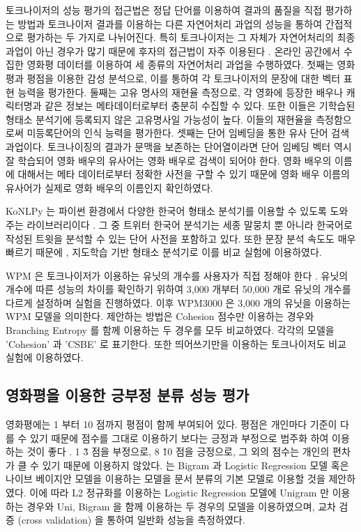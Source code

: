 \documentclass[oneside, ko,phd]{snuthesis_utf8_kor}
\begin{document}
토크나이저의 성능 평가의 접근법은 정답 단어를 이용하여 결과의 품질을 직접 평가하는 방법과 토크나이저 결과를 이용하는 다른 자연어처리 과업의 성능을 통하여 간접적으로 평가하는 두 가지로 나뉘어진다.
특히 토크나이저는 그 자체가 자연어처리의 최종 과업이 아닌 경우가 많기 때문에 후자의 접근법이 자주 이용된다 \cite{chung2009unsupervised}.
온라인 공간에서 수집한 영화평 데이터를 이용하여 세 종류의 자연어처리 과업을 수행하였다.
첫째는 영화평과 평점을 이용한 감성 분석으로, 이를 통하여 각 토크나이저의 문장에 대한 벡터 표현 능력을 평가한다.
둘째는 고유 명사의 재현율 측정으로, 각 영화에 등장한 배우나 캐릭터명과 같은 정보는 메타데이터로부터 충분히 수집할 수 있다.
또한 이들은 기학습된 형태소 분석기에 등록되지 않은 고유명사일 가능성이 높다.
이들의 재현율을 측정함으로써 미등록단어의 인식 능력을 평가한다.
셋째는 단어 임베딩을 통한 유사 단어 검색 과업이다.
토크나이징의 결과가 문맥을 보존하는 단어열이라면 단어 임베딩 벡터 역시 잘 학습되어 영화 배우의 유사어는 영화 배우로 검색이 되어야 한다.
영화 배우의 이름에 대해서는 메타 데이터로부터 정확한 사전을 구할 수 있기 때문에 영화 배우 이름의 유사어가 실제로 영화 배우의 이름인지 확인하였다.

KoNLPy 는 파이썬 환경에서 다양한 한국어 형태소 분석기를 이용할 수 있도록 도와주는 라이브러리이다 \cite{konlpy}.
그 중 트위터 한국어 분석기는 세종 말뭉치 뿐 아니라 한국어로 작성된 트윗을 분석할 수 있는 단어 사전을 포함하고 있다.
또한 문장 분석 속도도 매우 빠르기 때문에 \cite{konlpy}, 지도학습 기반 형태소 분석기로 이를 비교 실험에 이용하였다.

WPM 은 토크나이저가 이용하는 유닛의 개수를 사용자가 직접 정해야 한다 \cite{wu2016google}.
유닛의 개수에 따른 성능의 차이를 확인하기 위하여 3,000 개부터 50,000 개로 유닛의 개수를 다르게 설정하며 실험을 진행하였다.
이후 WPM3000 은 3,000 개의 유닛을 이용하는 WPM 모델을 의미한다.
제안하는 방법은 Cohesion 점수만 이용하는 경우와 Branching Entropy 를 함께 이용하는 두 경우를 모두 비교하였다.
각각의 모델을 'Cohesion' 과 'CSBE' 로 표기한다.
또한 띄어쓰기만을 이용하는 토크나이저도 비교 실험에 이용하였다.

\subsection{영화평을 이용한 긍부정 분류 성능 평가}
영화평에는 1 부터 10 점까지 평점이 함께 부여되어 있다.
평점은 개인마다 기준이 다를 수 있기 때문에 점수를 그대로 이용하기 보다는 긍정과 부정으로 범주화 하여 이용하는 것이 좋다 \cite{pang2008opinion, pang2002thumbs}.
1 \~ 3 점을 부정으로, 8 \~ 10 점을 긍정으로, 그 외의 점수는 개인의 편차가 클 수 있기 때문에 이용하지 않았다.
\cite{wang2012baselines, joulin2016bag} 는 Bigram 과 Logistic Regression 모델 혹은 나이브 베이지안 모델을 이용하는 모델을 문서 분류의 기본 모델로 이용할 것을 제안하였다.
이에 따라 L2 정규화를 이용하는 Logistic Regression 모델에 Unigram 만 이용하는 경우와 Uni, Bigram 을 함께 이용하는 두 경우의 모델을 이용하였으며, 교차 검증 (cross validation) 을 통하여 일반화 성능을 측정하였다.
\end{document}
